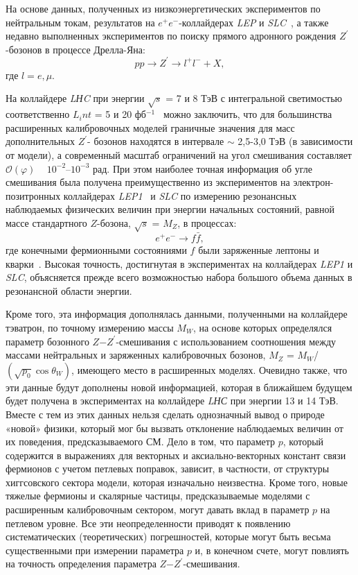 На основе данных, полученных из низкоэнергетических экспериментов по нейтральным токам, результатов на $e^+e^-$-коллайдерах \textit{LEP} и \textit{SLC}~\cite{Bobovnikov:2016}, а также недавно выполненных экспериментов по поиску прямого адронного рождения $Z^\prime$-бозонов в процессе Дрелла-Яна:
\begin{equation} \label{eq:drell}
	pp \rightarrow Z^\prime \rightarrow l^+l^- + X,
\end{equation}
где $l=e,\mu$. 

На коллайдере \textit{LНC} при энергии $\sqrt{s}$ = 7 и 8 ТэВ с интегральной светимостью соответственно $L_int$ = 5 и 20 фб${}^{-1}$~\cite{Bobovnikov:2016} можно заключить, что для большинства расширенных калибровочных моделей граничные значения для масс дополнительных $Z^\prime$- бозонов находятся в интервале $\sim$ 2,5-3,0 ТэВ (в зависимости от модели), а современный масштаб ограничений на угол смешивания составляет $\mathcal{O}(\varphi )$ ~ ${10}^{-2}$--${10}^{-3}$ рад. При этом наиболее точная информация об угле смешивания была получена преимущественно из экспериментов на электрон-позитронных коллайдерах \textit{LEP1}~\cite{schael:2006} и \textit{SLC} по измерению резонансных наблюдаемых физических величин при энергии начальных состояний, равной массе стандартного $Z$-бозона, $\sqrt{s}$ = $M_Z$, в процессах:
\begin{equation} \label{eq:drell2}
	e^+e^- \rightarrow f\bar{f},
\end{equation}
где конечными фермионными состояниями $f$ были заряженные лептоны и кварки~\cite{andreev-pankov:2012}. Высокая точность, достигнутая в экспериментах на коллайдерах \textit{LEP1} и \textit{SLC}, объясняется прежде всего возможностью набора большого объема данных в резонансной области энергии.

Кроме того, эта информация дополнялась данными, полученными на коллайдере тэватрон, по точному измерению массы $M_W$, на основе которых определялся параметр бозонного $Z$−$Z^\prime$-смешивания с использованием соотношения между массами нейтральных и заряженных калибровочных бозонов, $M_Z$ = $M_W$/$(\sqrt{p_0}\cos\theta_W)$, имеющего место в расширенных моделях. Очевидно также, что эти данные будут дополнены новой информацией, которая в ближайшем будущем будет получена в экспериментах на коллайдере \textit{LНС} при энергии 13 и 14 ТэВ. Вместе с тем из этих данных нельзя сделать однозначный вывод о природе «новой» физики, который мог бы вызвать отклонение наблюдаемых величин от их поведения, предсказываемого СМ. Дело в том, что параметр $p$, который содержится в выражениях для векторных и аксиально-векторных констант связи фермионов с учетом петлевых поправок, зависит, в частности, от структуры хиггсовского сектора модели, которая изначально неизвестна. Кроме того, новые тяжелые фермионы и скалярные частицы, предсказываемые моделями с расширенным калибровочным сектором, могут давать вклад в параметр $p$ на петлевом уровне. Все эти неопределенности приводят к появлению систематических (теоретических) погрешностей, которые могут быть весьма существенными при измерении параметра $p$ и, в конечном счете, могут повлиять на точность определения параметра $Z$−$Z^\prime$-смешивания.

